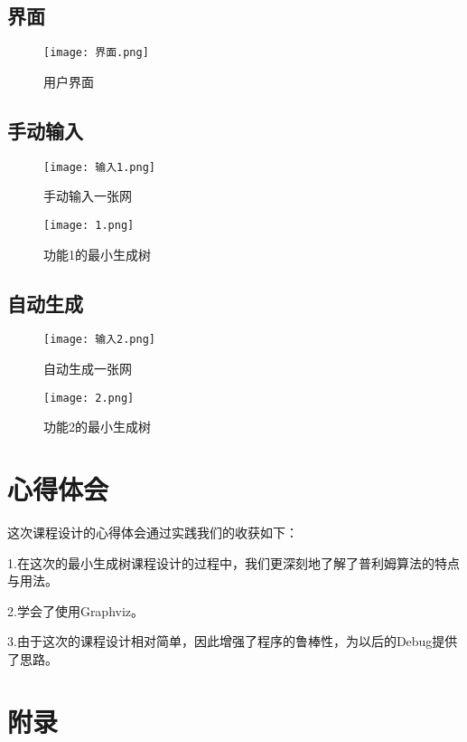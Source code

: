\documentclass{DateStructure}
\begin{document}
\subsection{界面}
\begin{figure}[H] 
\centering
\texttt{[image: 界面.png]}
\caption{用户界面}
\end{figure}
\subsection{手动输入}
\begin{figure}[H] 
\centering
\texttt{[image: 输入1.png]}
\caption{手动输入一张网}	
\end{figure}
\begin{figure}[H] 
\centering
\texttt{[image: 1.png]}
\caption{功能1的最小生成树}	
\end{figure}

\subsection{自动生成}
\begin{figure}[H] 
\centering
\texttt{[image: 输入2.png]}
\caption{自动生成一张网}	
\end{figure}
\begin{figure}[H] 
\centering
\texttt{[image: 2.png]}
\caption{功能2的最小生成树}	
\end{figure}



\section{心得体会}
这次课程设计的心得体会通过实践我们的收获如下：\par
1.在这次的最小生成树课程设计的过程中，我们更深刻地了解了普利姆算法的特点与用法。\par
2.学会了使用Graphviz。\par
3.由于这次的课程设计相对简单，因此增强了程序的鲁棒性，为以后的Debug提供了思路。

\newpage 
\section{附录}

\end{document}
